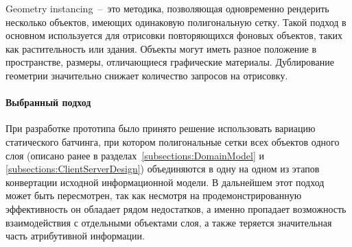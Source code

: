 \begin{itemize}
{        Geometry instancing~--~это методика, позволяющая
        одновременно рендерить нес\-колько объектов, имеющих
        одинаковую полигональную сетку.
        Такой подход в основном используется для отрисовки
        повторяющихся фоновых объектов, таких как растительность или здания.
        Объекты могут иметь разное положение в пространстве,
        размеры, отличающиеся графические материалы.
        Дублирование геометрии значительно снижает
        количество запросов на отрисовку.
    }
\end{itemize}

\paragraph{Выбранный подход}

При разработке прототипа было принято решение
использовать вариацию статического батчинга,
при котором полигональные сетки всех объектов одного слоя
(описано ранее в разделах~\ref{subsections:DomainModel}
и \ref{subsections:ClientServerDesign})
объединяются в одну на одном из этапов конвертации
исходной информационной модели.
В дальнейшем этот подход может быть пересмотрен,
так как несмотря на продемонстрированную эффективность
он обладает рядом недостатков,
а именно пропадает возможность взаимодействия с
отдельными объектами слоя, а также
теряется значительная часть атрибутивной информации.
